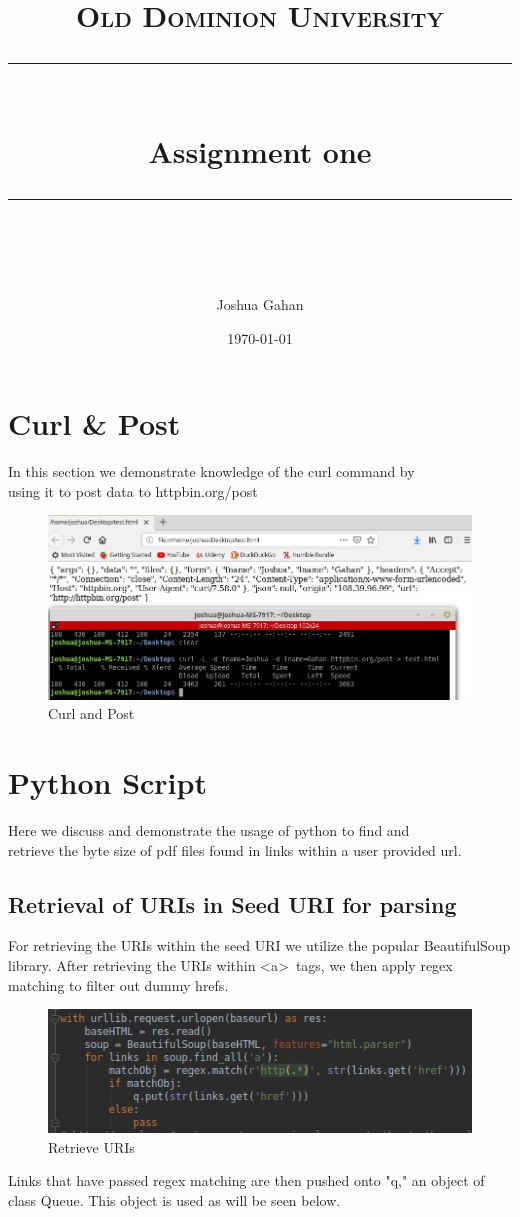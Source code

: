 \documentclass[11pt]{article}
\title{	
	\normalfont\normalsize
	\textsc{Old Dominion University}\\ %
	\vspace{25pt} %
	\rule{\linewidth}{0.5pt}\\ %
	\vspace{20pt} %
	{\huge Assignment one}\\ %
	\vspace{12pt} %
	\rule{\linewidth}{2pt}\\ %
	\vspace{20pt} %
}
\author{\LARGE Joshua Gahan} %
\date{\normalsize\today} %
\begin{document}
	\maketitle %
	\newpage
	
	\section{Curl & Post}
		 \hspace{10mm}In this section we demonstrate knowledge of the curl command by \\ 
		 using it to post data to httpbin.org/post \\
		 \begin{figure}[h!]
		 	\includegraphics[scale=0.5]{resources/curl.jpg}
		 	\caption{Curl and Post}
		 \end{figure}
		 
	\section{Python Script}
		\hspace{10mm}Here we discuss and demonstrate the usage of python to find and \\ retrieve the byte size of pdf files found in links within a user provided url. \\
		
		\subsection{Retrieval of URIs in Seed URI for parsing }
			\hspace{10mm}For retrieving the URIs within the seed URI we utilize the 
			popular BeautifulSoup library. After retrieving the URIs within \textless a\textgreater\ tags, we
			then apply regex matching to filter out dummy hrefs.  
		\begin{figure}[H]
			\includegraphics[scale=0.9]{resources/getURLs.jpg}
			\caption{Retrieve URIs}
		\end{figure}
			\hspace{10mm}Links that have passed regex matching are then pushed onto "q," an object of class Queue. This object is used as will be seen below. 
		
\end{document}
